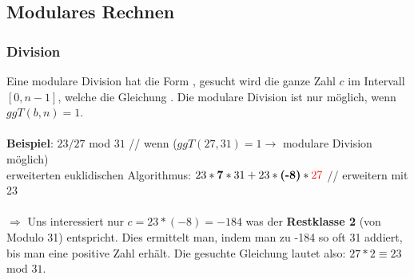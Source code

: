 \documentclass[landscape,twocolumn,a4paper]{article}
\begin{document}
\subsection{Modulares Rechnen}
\subsubsection{Division}
Eine modulare Division hat die Form  , gesucht wird die ganze Zahl $c$ im Intervall $[0,n-1]$, welche die Gleichung . Die modulare Division ist nur möglich, wenn $ggT(b,n)=1$. \\
\\
\textbf{Beispiel}: $23/27$ mod $31$ {\color{gray} // wenn ($ggT(27,31) = 1 \rightarrow$  modulare Division möglich) }\\
erweiterten euklidischen Algorithmus: $23 * \textbf{7} * 31 + 23 * \textbf{(-8)} * {\color{red}27}$  {\color{gray}// erweitern mit 23}\\
\\
$\Longrightarrow$ Uns interessiert nur $c = 23 * (-8) = -184$ was der \textbf{Restklasse 2} (von Modulo 31) entspricht. Dies ermittelt man, indem man zu -184 so oft 31 addiert, bis man eine positive Zahl erhält. Die gesuchte Gleichung lautet also: $27 * 2 \equiv 23$ mod $31$.
\end{document}
